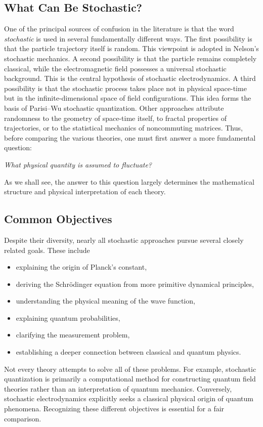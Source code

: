 \subsection{What Can Be Stochastic?}
One of the principal sources of confusion in the literature is that the
word \emph{stochastic} is used in several fundamentally different ways.
The first possibility is that the particle trajectory itself is random.
This viewpoint is adopted in Nelson's stochastic mechanics.
A second possibility is that the particle remains completely classical,
while the electromagnetic field possesses a universal stochastic
background. This is the central hypothesis of stochastic
electrodynamics.
A third possibility is that the stochastic process takes place not in
physical space-time but in the infinite-dimensional space of field
configurations. This idea forms the basis of Parisi--Wu stochastic
quantization.
Other approaches attribute randomness to the geometry of space-time
itself, to fractal properties of trajectories, or to the statistical
mechanics of noncommuting matrices.
Thus, before comparing the various theories, one must first answer a
more fundamental question:
\begin{center}
\emph{What physical quantity is assumed to fluctuate?}
\end{center}
As we shall see, the answer to this question largely determines the
mathematical structure and physical interpretation of each theory.
\subsection{Common Objectives}
Despite their diversity, nearly all stochastic approaches pursue several
closely related goals.
These include
\begin{itemize}
\item explaining the origin of Planck's constant,
\item deriving the Schrödinger equation from more primitive dynamical
principles,
\item understanding the physical meaning of the wave function,
\item explaining quantum probabilities,
\item clarifying the measurement problem,
\item establishing a deeper connection between classical and quantum
physics.
\end{itemize}
Not every theory attempts to solve all of these problems.
For example, stochastic quantization is primarily a computational method
for constructing quantum field theories rather than an interpretation of
quantum mechanics.
Conversely, stochastic electrodynamics explicitly seeks a classical
physical origin of quantum phenomena.
Recognizing these different objectives is essential for a fair
comparison.
